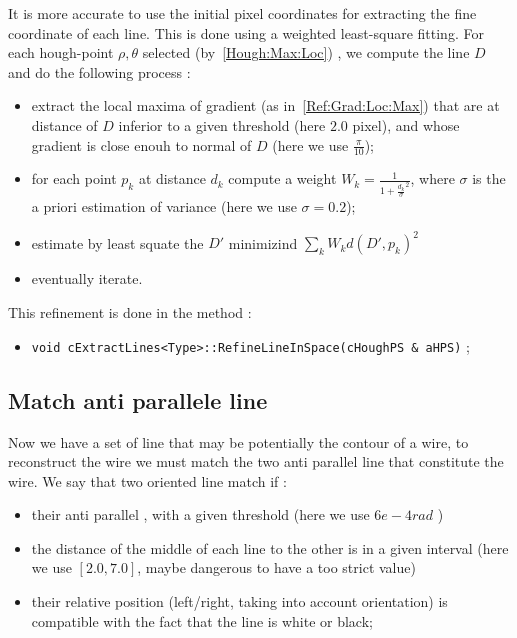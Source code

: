 \label{Line:Ref:ImSpace}

It is more accurate to use the initial pixel coordinates for extracting
the fine coordinate of each line. This is done using a weighted least-square fitting.
For each hough-point $\rho, \theta$ selected
(by~\ref{Hough:Max:Loc}) ,  we compute the line $D$ and do the following process :

\begin{itemize}
   \item  extract the local maxima of gradient (as in~\ref{Ref:Grad:Loc:Max}) that are
          at distance of $D$ inferior  to a given threshold  (here $2.0$ pixel), 
          and whose gradient is close enouh to normal of $D$ (here we use $\frac{\pi}{10}$);

    \item for each point $p_k$  at distance $d_k$ compute a weight $W_k=\frac{1}{1+\frac{d_k}{\sigma}^2}$,
          where $\sigma$ is the a priori estimation of variance (here we use $\sigma=0.2$);

     \item estimate by least squate the $D'$ minimizind $\sum_k W_k d(D',p_k)^2 $

     \item eventually iterate.
\end{itemize}


This refinement  is done in the method :

\begin{itemize}
   \item {\tt  void  cExtractLines<Type>::RefineLineInSpace(cHoughPS \& aHPS)} ;

\end{itemize}



\subsection{Match anti parallele line}

Now we have a set of line that may be potentially the contour of a wire, to reconstruct 
the wire we must match the two anti parallel line that constitute the wire.  We say
that two oriented line match if :

\begin{itemize}
    \item  their anti parallel , with a given threshold (here we use $6e-4 rad$ ) 
    \item  the distance of the middle of each line to the other is in a given interval
           (here we use $[2.0,7.0]$,  maybe dangerous to have a too strict value)

    \item  their relative position (left/right, taking into account orientation) 
           is compatible with the fact that the line is white or black;
\end{itemize}


